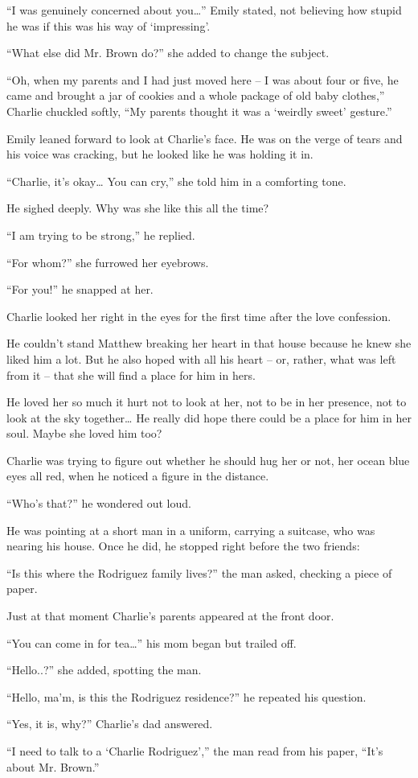 “I was genuinely concerned about you…” Emily stated, not believing how stupid he was if this was his way of ‘impressing’.

“What else did Mr. Brown do?” she added to change the subject.

“Oh, when my parents and I had just moved here – I was about four or five, he came and brought a jar of cookies and a whole package of old baby clothes,” Charlie chuckled softly, “My parents thought it was a ‘weirdly sweet’ gesture.”

Emily leaned forward to look at Charlie’s face. He was on the verge of tears and his voice was cracking, but he looked like he was holding it in.

“Charlie, it’s okay… You can cry,” she told him in a comforting tone.

He sighed deeply. Why was she like this all the time?

“I am trying to be strong,” he replied.

“For whom?” she furrowed her eyebrows.

“For you!” he snapped at her.

Charlie looked her right in the eyes for the first time after the love confession.

He couldn’t stand Matthew breaking her heart in that house because he knew she liked him a lot. But he also hoped with all his heart – or, rather, what was left from it – that she will find a place for him in hers.

He loved her so much it hurt not to look at her, not to be in her presence, not to look at the sky together… He really did hope there could be a place for him in her soul. Maybe she loved him too?

Charlie was trying to figure out whether he should hug her or not, her ocean blue eyes all red, when he noticed a figure in the distance.

“Who’s that?” he wondered out loud.

He was pointing at a short man in a uniform, carrying a suitcase, who was nearing his house. Once he did, he stopped right before the two friends:

“Is this where the Rodriguez family lives?” the man asked, checking a piece of paper.

Just at that moment Charlie’s parents appeared at the front door.

“You can come in for tea…” his mom began but trailed off.

“Hello..?” she added, spotting the man.

“Hello, ma’m, is this the Rodriguez residence?” he repeated his question.

“Yes, it is, why?” Charlie’s dad answered.

“I need to talk to a ‘Charlie Rodriguez’,” the man read from his paper, “It’s about Mr. Brown.”